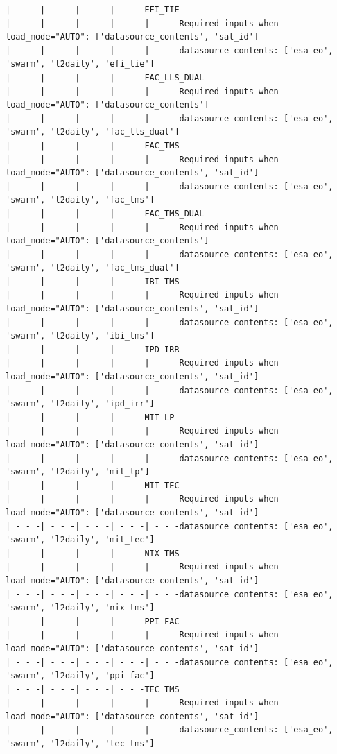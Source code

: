 \begin{verbatim}
| - - -| - - -| - - -| - - -EFI_TIE
| - - -| - - -| - - -| - - -| - - -Required inputs when load_mode="AUTO": ['datasource_contents', 'sat_id']
| - - -| - - -| - - -| - - -| - - -datasource_contents: ['esa_eo', 'swarm', 'l2daily', 'efi_tie']
| - - -| - - -| - - -| - - -FAC_LLS_DUAL
| - - -| - - -| - - -| - - -| - - -Required inputs when load_mode="AUTO": ['datasource_contents']
| - - -| - - -| - - -| - - -| - - -datasource_contents: ['esa_eo', 'swarm', 'l2daily', 'fac_lls_dual']
| - - -| - - -| - - -| - - -FAC_TMS
| - - -| - - -| - - -| - - -| - - -Required inputs when load_mode="AUTO": ['datasource_contents', 'sat_id']
| - - -| - - -| - - -| - - -| - - -datasource_contents: ['esa_eo', 'swarm', 'l2daily', 'fac_tms']
| - - -| - - -| - - -| - - -FAC_TMS_DUAL
| - - -| - - -| - - -| - - -| - - -Required inputs when load_mode="AUTO": ['datasource_contents']
| - - -| - - -| - - -| - - -| - - -datasource_contents: ['esa_eo', 'swarm', 'l2daily', 'fac_tms_dual']
| - - -| - - -| - - -| - - -IBI_TMS
| - - -| - - -| - - -| - - -| - - -Required inputs when load_mode="AUTO": ['datasource_contents', 'sat_id']
| - - -| - - -| - - -| - - -| - - -datasource_contents: ['esa_eo', 'swarm', 'l2daily', 'ibi_tms']
| - - -| - - -| - - -| - - -IPD_IRR
| - - -| - - -| - - -| - - -| - - -Required inputs when load_mode="AUTO": ['datasource_contents', 'sat_id']
| - - -| - - -| - - -| - - -| - - -datasource_contents: ['esa_eo', 'swarm', 'l2daily', 'ipd_irr']
| - - -| - - -| - - -| - - -MIT_LP
| - - -| - - -| - - -| - - -| - - -Required inputs when load_mode="AUTO": ['datasource_contents', 'sat_id']
| - - -| - - -| - - -| - - -| - - -datasource_contents: ['esa_eo', 'swarm', 'l2daily', 'mit_lp']
| - - -| - - -| - - -| - - -MIT_TEC
| - - -| - - -| - - -| - - -| - - -Required inputs when load_mode="AUTO": ['datasource_contents', 'sat_id']
| - - -| - - -| - - -| - - -| - - -datasource_contents: ['esa_eo', 'swarm', 'l2daily', 'mit_tec']
| - - -| - - -| - - -| - - -NIX_TMS
| - - -| - - -| - - -| - - -| - - -Required inputs when load_mode="AUTO": ['datasource_contents', 'sat_id']
| - - -| - - -| - - -| - - -| - - -datasource_contents: ['esa_eo', 'swarm', 'l2daily', 'nix_tms']
| - - -| - - -| - - -| - - -PPI_FAC
| - - -| - - -| - - -| - - -| - - -Required inputs when load_mode="AUTO": ['datasource_contents', 'sat_id']
| - - -| - - -| - - -| - - -| - - -datasource_contents: ['esa_eo', 'swarm', 'l2daily', 'ppi_fac']
| - - -| - - -| - - -| - - -TEC_TMS
| - - -| - - -| - - -| - - -| - - -Required inputs when load_mode="AUTO": ['datasource_contents', 'sat_id']
| - - -| - - -| - - -| - - -| - - -datasource_contents: ['esa_eo', 'swarm', 'l2daily', 'tec_tms']

\end{verbatim}

